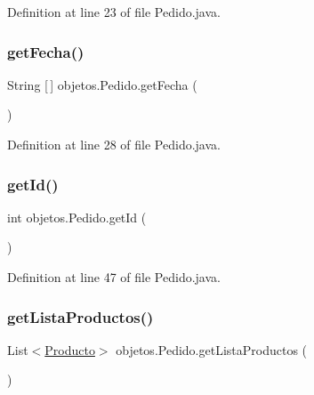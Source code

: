 Definition at line 23 of file Pedido.\+java.

\mbox{\label{classobjetos_1_1_pedido_ad9981fc190fd02fbf4f9c44811fc2102}} 
\subsubsection{\texorpdfstring{get\+Fecha()}{getFecha()}}
{\footnotesize\ttfamily String \mbox{[}$\,$\mbox{]} objetos.\+Pedido.\+get\+Fecha (\begin{DoxyParamCaption}{ }\end{DoxyParamCaption})}



Definition at line 28 of file Pedido.\+java.

\mbox{\label{classobjetos_1_1_pedido_a2cedae9fd179897d4d7e83b655d6fa58}} 
\subsubsection{\texorpdfstring{get\+Id()}{getId()}}
{\footnotesize\ttfamily int objetos.\+Pedido.\+get\+Id (\begin{DoxyParamCaption}{ }\end{DoxyParamCaption})}



Definition at line 47 of file Pedido.\+java.

\mbox{\label{classobjetos_1_1_pedido_a9e4f2c0942939a0defdea21140e85e94}} 
\subsubsection{\texorpdfstring{get\+Lista\+Productos()}{getListaProductos()}}
{\footnotesize\ttfamily List$<$\mbox{\hyperlink{classobjetos_1_1_producto}{Producto}}$>$ objetos.\+Pedido.\+get\+Lista\+Productos (\begin{DoxyParamCaption}{ }\end{DoxyParamCaption})}



